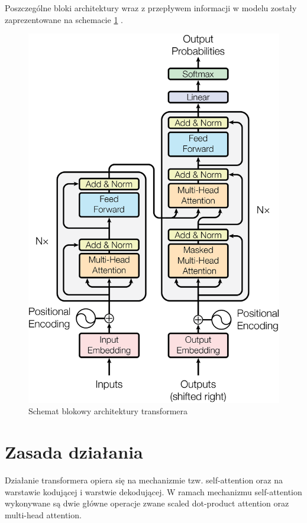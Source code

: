 \documentclass[12pt,a4paper,twoside]{book} %
\begin{document}
Poszczególne bloki architektury wraz z przepływem informacji w modelu zostały zaprezentowane na schemacie \ref{fig:transformer_architecture} \cite{vaswani2023attentionneed}.

\begin{figure}[H]
    \centering
	\includegraphics[scale=0.20]{figs/architecture.png}
	\caption{Schemat blokowy architektury transformera}
	\label{fig:transformer_architecture}
\end{figure}

\section{Zasada działania}
Działanie transformera opiera się na mechanizmie tzw. self-attention oraz na warstawie kodującej i warstwie dekodującej.
W ramach mechanizmu self-attention wykonywane są dwie główne operacje zwane scaled dot-product attention oraz multi-head attention.
\end{document}
